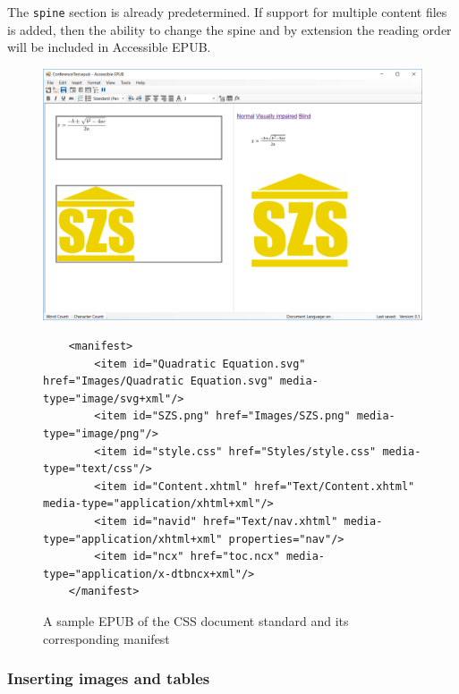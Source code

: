 The \lstinline|spine| section is already predetermined. If support for multiple content files is added, then the ability to change the spine and by extension the reading order will be included in Accessible EPUB.

\begin{figure}[h]
	\includegraphics[width=\linewidth]{figures/AccessibleEPUBmathSZSvi.png}
	\begin{lstlisting}
	<manifest>
		<item id="Quadratic Equation.svg" href="Images/Quadratic Equation.svg" media-type="image/svg+xml"/>
		<item id="SZS.png" href="Images/SZS.png" media-type="image/png"/>
		<item id="style.css" href="Styles/style.css" media-type="text/css"/>
		<item id="Content.xhtml" href="Text/Content.xhtml" media-type="application/xhtml+xml"/>
		<item id="navid" href="Text/nav.xhtml" media-type="application/xhtml+xml" properties="nav"/>
		<item id="ncx" href="toc.ncx" media-type="application/x-dtbncx+xml"/>
	</manifest>
	\end{lstlisting}
	\caption{A sample EPUB of the CSS document standard and its corresponding manifest}	
	\label{fig:manifestExample}
\end{figure}

\subsubsection{Inserting images and tables}

